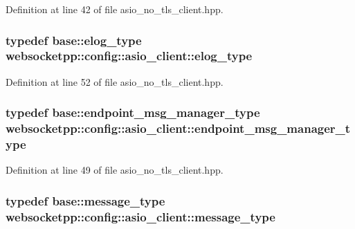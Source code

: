 Definition at line 42 of file asio\+\_\+no\+\_\+tls\+\_\+client.\+hpp.

\hypertarget{structwebsocketpp_1_1config_1_1asio__client_abbef282de8c085b57d8f6780f0187a1d}{}
\subsubsection[{elog\+\_\+type}]{\setlength{\rightskip}{0pt plus 5cm}typedef {\bf base\+::elog\+\_\+type} {\bf websocketpp\+::config\+::asio\+\_\+client\+::elog\+\_\+type}}\label{structwebsocketpp_1_1config_1_1asio__client_abbef282de8c085b57d8f6780f0187a1d}


Definition at line 52 of file asio\+\_\+no\+\_\+tls\+\_\+client.\+hpp.

\hypertarget{structwebsocketpp_1_1config_1_1asio__client_aaeb34609830b9038bff2bbe3fec9d420}{}
\subsubsection[{endpoint\+\_\+msg\+\_\+manager\+\_\+type}]{\setlength{\rightskip}{0pt plus 5cm}typedef {\bf base\+::endpoint\+\_\+msg\+\_\+manager\+\_\+type} {\bf websocketpp\+::config\+::asio\+\_\+client\+::endpoint\+\_\+msg\+\_\+manager\+\_\+type}}\label{structwebsocketpp_1_1config_1_1asio__client_aaeb34609830b9038bff2bbe3fec9d420}


Definition at line 49 of file asio\+\_\+no\+\_\+tls\+\_\+client.\+hpp.

\hypertarget{structwebsocketpp_1_1config_1_1asio__client_a5148ca616b771b4a701f7a4d9b68cdbf}{}
\subsubsection[{message\+\_\+type}]{\setlength{\rightskip}{0pt plus 5cm}typedef {\bf base\+::message\+\_\+type} {\bf websocketpp\+::config\+::asio\+\_\+client\+::message\+\_\+type}}\label{structwebsocketpp_1_1config_1_1asio__client_a5148ca616b771b4a701f7a4d9b68cdbf}


